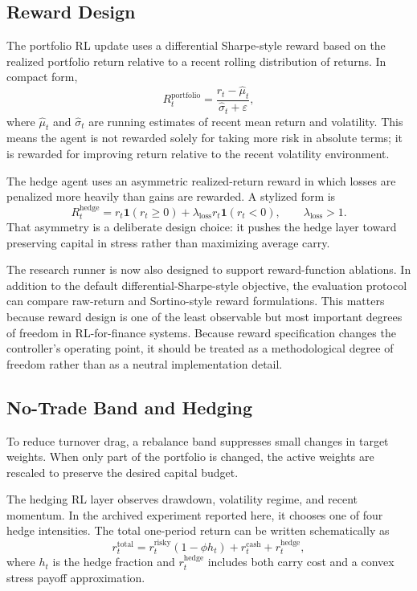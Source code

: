 \documentclass[10pt,twocolumn]{article}
\begin{document}
\subsection{Reward Design}

The portfolio RL update uses a differential Sharpe-style reward based on the
realized portfolio return relative to a recent rolling distribution of returns.
In compact form,
\[
R_t^{\mathrm{portfolio}}
= \frac{r_t - \hat{\mu}_t}{\hat{\sigma}_t + \varepsilon},
\]
where $\hat{\mu}_t$ and $\hat{\sigma}_t$ are running estimates of recent mean
return and volatility. This means the agent is not rewarded solely for taking
more risk in absolute terms; it is rewarded for improving return relative to
the recent volatility environment.

The hedge agent uses an asymmetric realized-return reward in which losses are
penalized more heavily than gains are rewarded. A stylized form is
\[
R_t^{\mathrm{hedge}}
= r_t \mathbf{1}(r_t \ge 0)
 + \lambda_{\mathrm{loss}} r_t \mathbf{1}(r_t < 0),
\qquad \lambda_{\mathrm{loss}} > 1.
\]
That asymmetry is a deliberate design choice: it pushes the hedge layer toward
preserving capital in stress rather than maximizing average carry.

The research runner is now also designed to support reward-function ablations.
In addition to the default differential-Sharpe-style objective, the evaluation
protocol can compare raw-return and Sortino-style reward formulations. This
matters because reward design is one of the least observable but most important
degrees of freedom in RL-for-finance systems.
Because reward specification changes the controller's operating point, it should
be treated as a methodological degree of freedom rather than as a neutral
implementation detail.

\subsection{No-Trade Band and Hedging}

To reduce turnover drag, a rebalance band suppresses small changes in target
weights. When only part of the portfolio is changed, the active weights are
rescaled to preserve the desired capital budget.

The hedging RL layer observes drawdown, volatility regime, and recent momentum.
In the archived experiment reported here, it chooses one of four hedge
intensities. The total one-period return can be
written schematically as
\[
r_t^{\text{total}} =
r_t^{\text{risky}}(1-\phi h_t) + r_t^{\text{cash}} + r_t^{\text{hedge}},
\]
where $h_t$ is the hedge fraction and $r_t^{\text{hedge}}$ includes both carry
cost and a convex stress payoff approximation.
\end{document}

